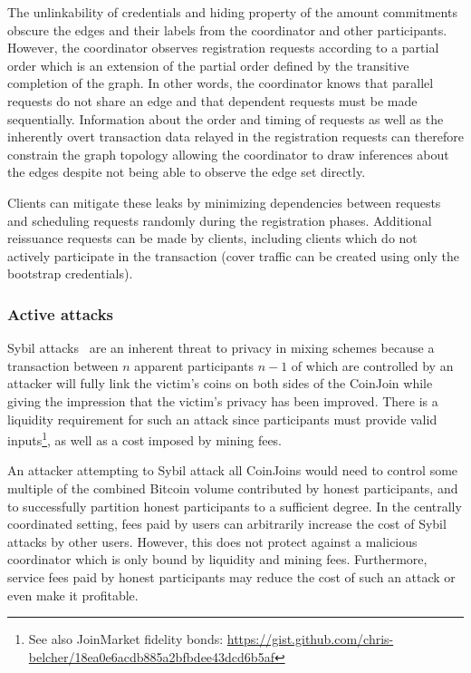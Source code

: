 \documentclass[a4paper]{article}
\begin{document}
The unlinkability of credentials and hiding property of the amount commitments obscure the edges and their labels from the coordinator and other participants. However, the coordinator observes registration requests according to a partial order which is an extension of the partial order defined by the transitive completion of the graph. In other words, the coordinator knows that parallel requests do not share an edge and that dependent requests must be made sequentially. Information about the order and timing of requests as well as the inherently overt transaction data relayed in the registration requests can therefore constrain the graph topology allowing the coordinator to draw inferences about the edges despite not being able to observe the edge set directly.

Clients can mitigate these leaks by minimizing dependencies between requests and scheduling requests randomly during the registration phases. Additional reissuance requests can be made by clients, including clients which do not actively participate in the transaction (cover traffic can be created using only the bootstrap credentials).

\subsubsection{Active attacks}\label{sec:active}

Sybil attacks~\cite{douceur2002sybil} are an inherent threat to privacy in mixing schemes because a transaction between $n$ apparent participants $n-1$ of which are controlled by an attacker will fully link the victim's coins on both sides of the CoinJoin while giving the impression that the victim's privacy has been improved. There is a liquidity requirement for such an attack since participants must provide valid inputs\footnote{See also JoinMarket fidelity bonds: \url{https://gist.github.com/chris-belcher/18ea0e6acdb885a2bfbdee43dcd6b5af}}, as well as a cost imposed by mining fees.

An attacker attempting to Sybil attack all CoinJoins would need to control some multiple of the combined Bitcoin volume contributed by honest participants, and to successfully partition honest participants to a sufficient degree. In the centrally coordinated setting, fees paid by users can arbitrarily increase the cost of Sybil attacks by other users. However, this does not protect against a malicious coordinator which is only bound by liquidity and mining fees. Furthermore, service fees paid by honest participants may reduce the cost of such an attack or even make it profitable.
\end{document}
